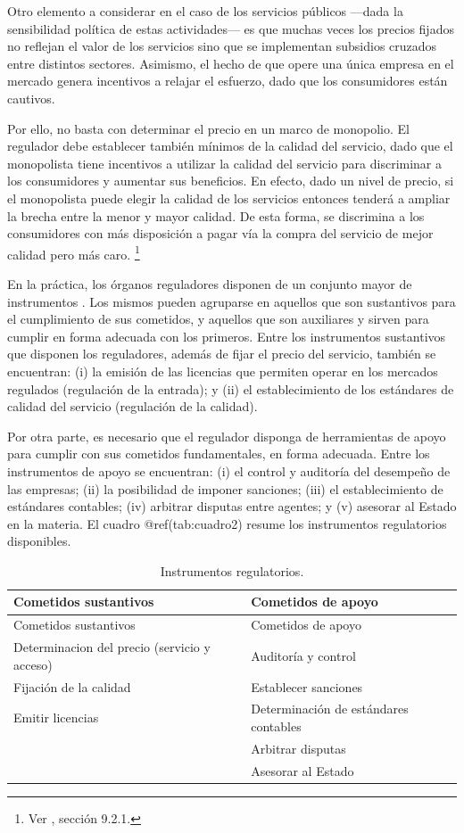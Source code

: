 \documentclass[
  12pt,
  spanish,
]{book}
\begin{document}
Otro elemento a considerar en el caso de los servicios públicos ---dada
la sensibilidad política de estas actividades--- es que muchas veces los
precios fijados no reflejan el valor de los servicios sino que se
implementan subsidios cruzados entre distintos sectores. Asimismo, el
hecho de que opere una única empresa en el mercado genera incentivos a
relajar el esfuerzo, dado que los consumidores están cautivos.

Por ello, no basta con determinar el precio en un marco de monopolio. El
regulador debe establecer también mínimos de la calidad del servicio,
dado que el monopolista tiene incentivos a utilizar la calidad del
servicio para discriminar a los consumidores y aumentar sus beneficios.
En efecto, dado un nivel de precio, si el monopolista puede elegir la
calidad de los servicios entonces tenderá a ampliar la brecha entre la
menor y mayor calidad. De esta forma, se discrimina a los consumidores
con más disposición a pagar vía la compra del servicio de mejor calidad
pero más caro. \footnote{Ver \citet{Belleflamme2015}, sección 9.2.1.}

En la práctica, los órganos reguladores disponen de un conjunto mayor de
instrumentos \citep{Berg2013}. Los mismos pueden agruparse en aquellos
que son sustantivos para el cumplimiento de sus cometidos, y aquellos
que son auxiliares y sirven para cumplir en forma adecuada con los
primeros. Entre los instrumentos sustantivos que disponen los
reguladores, además de fijar el precio del servicio, también se
encuentran: (i) la emisión de las licencias que permiten operar en los
mercados regulados (regulación de la entrada); y (ii) el establecimiento
de los estándares de calidad del servicio (regulación de la calidad).

Por otra parte, es necesario que el regulador disponga de herramientas
de apoyo para cumplir con sus cometidos fundamentales, en forma
adecuada. Entre los instrumentos de apoyo se encuentran: (i) el control
y auditoría del desempeño de las empresas; (ii) la posibilidad de
imponer sanciones; (iii) el establecimiento de estándares contables;
(iv) arbitrar disputas entre agentes; y (v) asesorar al Estado en la
materia. El cuadro @ref(tab:cuadro2) resume los instrumentos
regulatorios disponibles.

\begin{longtable}[]{@{}ll@{}}
\caption{Instrumentos regulatorios.}\tabularnewline
\toprule
Cometidos sustantivos & Cometidos de apoyo\tabularnewline
\midrule
\endfirsthead
\toprule
Cometidos sustantivos & Cometidos de apoyo\tabularnewline
\midrule
\endhead
Determinacion del precio (servicio y acceso) & Auditoría y
control\tabularnewline
Fijación de la calidad & Establecer sanciones\tabularnewline
Emitir licencias & Determinación de estándares contables\tabularnewline
& Arbitrar disputas\tabularnewline
& Asesorar al Estado\tabularnewline
\bottomrule
\end{longtable}
\end{document}
